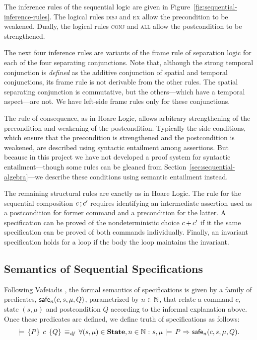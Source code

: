 \documentclass[11pt]{report}
\begin{document}
The inference rules of the sequential logic are given in Figure~\ref{fig:sequential-inference-rules}. The logical rules \textsc{disj} and \textsc{ex} allow the precondition to be weakened. Dually, the logical rules \textsc{conj} and \textsc{all} allow the postcondition to be strengthened. 

The next four inference rules are variants of the frame rule of separation logic for each of the four separating conjunctions. Note that, although the strong temporal conjunction is \emph{defined} as the additive conjunction of spatial and temporal conjunctions, its frame rule is not derivable from the other rules. The spatial separating conjunction is commutative, but the others---which have a temporal aspect---are not. We have left-side frame rules only for these conjunctions. 

The rule of consequence, as in Hoare Logic, allows arbitrary strengthening of the precondition and weakening of the postcondition. Typically the side conditions, which ensure that the precondition is strengthened and
 the postcondition is weakened, are described using syntactic entailment among assertions. But because in this project we have not developed a proof system for syntactic entailment---though some rules can be gleaned from Section~\ref{sec:sequential-algebra}---we describe these conditions using semantic entailment instead. 

The remaining structural rules are exactly as in Hoare Logic. The rule for the sequential composition $c \operatorname{;} c'$ requires identifying an intermediate assertion used as a postcondition for former command and a precondition for the latter. A specification can be proved of the nondeterministic choice $c \operatorname{+} c'$ if it the same specification can be proved of both commands individually. Finally, an invariant specification holds for a loop if the body the loop maintains the invariant. 

\subsection{Semantics of Sequential Specifications}

Following Vafeiadis \cite{V11}, the formal semantics of specifications is given by a family of predicates, $\mathsf{safe}_{n}(c,s,\mu,Q)$, parametrized by $n \in \mathbb{N}$, that relate a command $c$, state $(s,\mu)$ and postcondition $Q$ according to the informal explanation above. Once these predicates are defined, we define truth of specifications as follows: \[ \models\,\left\lbrace P \right\rbrace\;c\;\left\lbrace Q \right\rbrace \operatorname{\;\equiv_{\mathit{df}}\;} \forall (s,\mu) \in \mathbf{State}, n \in \mathbb{N} \operatorname{\,:\,} s,\mu \,\models\, P \operatorname{\,\Rightarrow\,} \mathsf{safe}_{n}(c,s,\mu,Q).\]
\end{document}
